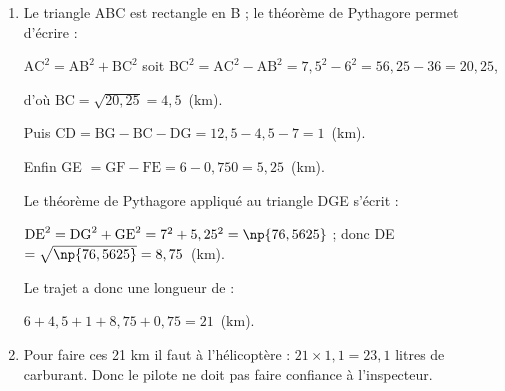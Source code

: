 \begin{enumerate}
\item %

Le triangle ABC est rectangle en B ; le théorème de Pythagore permet d'écrire :

$\text{AC}^2 = \text{AB}^2 + \text{BC}^2$ soit $\text{BC}^2 = \text{AC}^2 - \text{AB}^2 = 7,5^2 - 6^2 = 56,25 - 36 = 20,25$, 

d'où $\text{BC} = \sqrt{20,25} = 4,5$~(km).

Puis $\text{CD} = \text{BG} - \text{BC} - \text{DG} = 12,5 - 4,5 - 7 = 1$~(km).

Enfin GE $ = \text{GF} - \text{FE} = 6 - 0,750 = 5,25$~(km).

Le théorème de Pythagore appliqué au triangle DGE s'écrit :

$\text{DE}^2 = \text{DG}^2 + \text{GE}^2 = 7^2 + 5,25^2 = \np{76,5625}$ ; donc DE $ = \sqrt{\np{76,5625}} = 8,75$~(km).

Le trajet a donc une longueur de :

$6 + 4,5 + 1 + 8,75 + 0,75 = 21$~(km).

\item %
Pour faire ces 21 km il faut à l'hélicoptère : $21 \times 1,1 = 23,1$ litres de carburant. Donc le pilote ne doit pas faire confiance à l'inspecteur.
\end{enumerate}

\vspace{0,5cm}

